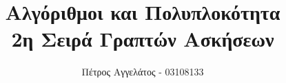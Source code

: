 \title{
  Αλγόριθμοι και Πολυπλοκότητα\\
  2η Σειρά Γραπτών Ασκήσεων
}
\ifanonymous{\iflncs
\author{}\institute{}
\fi}
\else
\author{Πέτρος Αγγελάτος - 03108133}
\iflncs
{}
\else
{}
\fi
\fi
